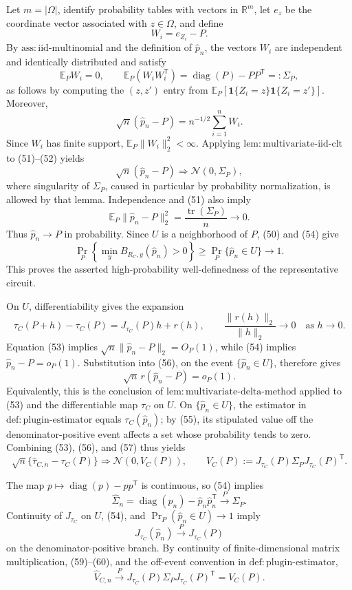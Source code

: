 Let \(m=|\Omega|\), identify probability tables with vectors in \(\mathbb R^m\), let \(e_z\) be the coordinate vector associated with \(z\in\Omega\), and define
\[
 W_i=e_{Z_i}-P.
\]
By \(\mathrm{ass{:}iid\text{-}multinomial}\) and the definition of \(\widehat p_n\), the vectors \(W_i\) are independent and identically distributed and satisfy
\[
 \mathbb E_P W_i=0,
 \qquad
 \mathbb E_P(W_iW_i^{\mathsf T})
 =\operatorname{diag}(P)-PP^{\mathsf T}=:\Sigma_P, \tag{51}
\]
as follows by computing the \((z,z')\) entry from
\(\mathbb E_P[\mathbf 1\{Z_i=z\}\mathbf 1\{Z_i=z'\}]\).  Moreover,
\[
 \sqrt n(\widehat p_n-P)=n^{-1/2}\sum_{i=1}^n W_i. \tag{52}
\]
Since \(W_i\) has finite support, \(\mathbb E_P\|W_i\|_2^2<\infty\).  Applying \(\mathrm{lem{:}multivariate\text{-}iid\text{-}clt}\) to (51)--(52) yields
\[
 \sqrt n(\widehat p_n-P)\Rightarrow\mathcal N(0,\Sigma_P), \tag{53}
\]
where singularity of \(\Sigma_P\), caused in particular by probability normalization, is allowed by that lemma.  Independence and (51) also imply
\[
 \mathbb E_P\|\widehat p_n-P\|_2^2
 =\frac{\operatorname{tr}(\Sigma_P)}{n}\longrightarrow0. \tag{54}
\]
Thus \(\widehat p_n\to P\) in probability.  Since \(U\) is a neighborhood of \(P\), (50) and (54) give
\[
 \Pr_P\!\left\{\min_yB_{R_C,y}(\widehat p_n)>0\right\}
 \geq \Pr_P\{\widehat p_n\in U\}\longrightarrow1. \tag{55}
\]
This proves the asserted high-probability well-definedness of the representative circuit.

On \(U\), differentiability gives the expansion
\[
 \tau_C(P+h)-\tau_C(P)=J_{\tau_C}(P)h+r(h),
 \qquad
 \frac{\|r(h)\|_2}{\|h\|_2}\longrightarrow0
 \quad\text{as }h\to0. \tag{56}
\]
Equation (53) implies \(\sqrt n\|\widehat p_n-P\|_2=O_P(1)\), while (54) implies \(\widehat p_n-P=o_P(1)\).  Substitution into (56), on the event \(\{\widehat p_n\in U\}\), therefore gives
\[
 \sqrt n\,r(\widehat p_n-P)=o_P(1). \tag{57}
\]
Equivalently, this is the conclusion of \(\mathrm{lem{:}multivariate\text{-}delta\text{-}method}\) applied to (53) and the differentiable map \(\tau_C\) on \(U\).  On \(\{\widehat p_n\in U\}\), the estimator in \(\mathrm{def{:}plugin\text{-}estimator}\) equals \(\tau_C(\widehat p_n)\); by (55), its stipulated value off the denominator-positive event affects a set whose probability tends to zero.  Combining (53), (56), and (57) thus yields
\[
 \sqrt n\{\widehat\tau_{C,n}-\tau_C(P)\}
 \Rightarrow
 \mathcal N\!\left(0,V_C(P)\right),
 \qquad
 V_C(P):=J_{\tau_C}(P)\Sigma_PJ_{\tau_C}(P)^{\mathsf T}. \tag{58}
\]

The map \(p\mapsto\operatorname{diag}(p)-pp^{\mathsf T}\) is continuous, so (54) implies
\[
 \widehat\Sigma_n
 =\operatorname{diag}(\widehat p_n)-\widehat p_n\widehat p_n^{\mathsf T}
 \xrightarrow{P}\Sigma_P. \tag{59}
\]
Continuity of \(J_{\tau_C}\) on \(U\), (54), and \(\Pr_P(\widehat p_n\in U)\to1\) imply
\[
 J_{\tau_C}(\widehat p_n)\xrightarrow{P}J_{\tau_C}(P) \tag{60}
\]
on the denominator-positive branch.  By continuity of finite-dimensional matrix multiplication, (59)--(60), and the off-event convention in \(\mathrm{def{:}plugin\text{-}estimator}\),
\[
 \widehat V_{C,n}
 \xrightarrow{P}
 J_{\tau_C}(P)\Sigma_PJ_{\tau_C}(P)^{\mathsf T}
 =V_C(P). \tag{61}
\]

